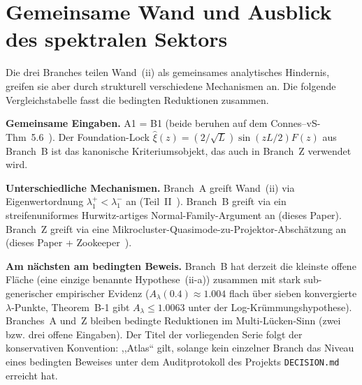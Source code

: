 \documentclass[12pt,a4paper]{article}
\theoremstyle{definition}
\theoremstyle{remark}
\begin{document}
\section{Gemeinsame Wand und Ausblick des spektralen Sektors}
\label{sec:common-wall}

Die drei Branches teilen Wand~(ii) als gemeinsames analytisches
Hindernis, greifen sie aber durch strukturell verschiedene Mechanismen
an. Die folgende Vergleichstabelle fasst die bedingten Reduktionen
zusammen.

\begin{center}
\renewcommand{\arraystretch}{1.3}
\end{center}

\noindent\textbf{Gemeinsame Eingaben.} A1 = B1 (beide beruhen auf dem
Connes--vS-Thm~5.6~\cite{ConnesvS2025}). Der Foundation-Lock
$\hat\xi(z) = (2/\sqrt L)\sin(zL/2)F(z)$ aus Branch~B ist das
kanonische Kriteriumsobjekt, das auch in Branch~Z verwendet wird.

\noindent\textbf{Unterschiedliche Mechanismen.} Branch~A greift
Wand~(ii) via Eigenwertordnung $\lambda_1^+ < \lambda_1^-$ an
(Teil~II~\cite{Geiger2026partII}). Branch~B greift via ein
streifenuniformes Hurwitz-artiges Normal-Family-Argument an (dieses
Paper). Branch~Z greift via eine
Mikrocluster-Quasimode-zu-Projektor-Abschätzung an (dieses Paper +
Zookeeper~\cite{Geiger2026zookeeper}).

\noindent\textbf{Am nächsten am bedingten Beweis.} Branch~B hat derzeit
die kleinste offene Fläche (eine einzige benannte Hypothese~(ii-a))
zusammen mit stark sub-generischer empirischer Evidenz
($A_\lambda(0.4)\approx 1.004$ flach über sieben konvergierte
$\lambda$-Punkte, Theorem~B-1 gibt $A_\lambda \leq 1.0063$ unter der
Log-Krümmungshypothese). Branches~A und~Z bleiben bedingte Reduktionen
im Multi-Lücken-Sinn (zwei bzw. drei offene Eingaben). Der Titel der
vorliegenden Serie folgt der konservativen Konvention: ,,Atlas`` gilt,
solange kein einzelner Branch das Niveau eines bedingten Beweises unter
dem Auditprotokoll des Projekts \texttt{DECISION.md} erreicht hat.
\end{document}
